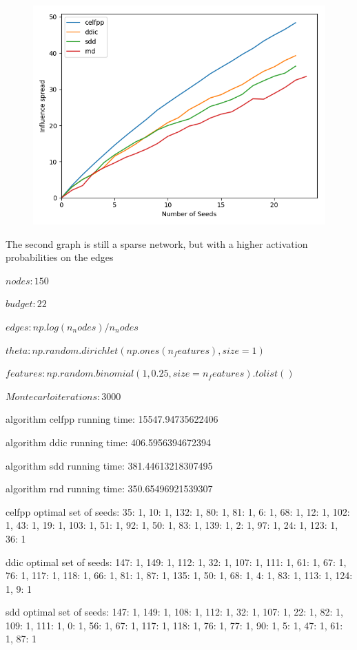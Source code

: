 \begin{figure}[H]
	\centering
	\includegraphics[scale=0.6]{img/IMG1}
\end{figure}


The second graph is still a sparse network, but with a higher activation probabilities on the edges

$nodes: 150$

$budget: 22$

$edges: np.log(n_nodes) / n_nodes$

$theta: np.random.dirichlet(np.ones(n_features), size=1)$

$features: np.random.binomial(1, 0.25, size=n_features).tolist()$

$Montecarlo iterations: 3000$

algorithm celfpp running time: 15547.94735622406

algorithm ddic running time: 406.5956394672394

algorithm sdd running time: 381.44613218307495

algorithm rnd running time: 350.65496921539307

celfpp optimal set of seeds: {35: 1, 10: 1, 132: 1, 80: 1, 81: 1, 6: 1, 68: 1, 12: 1, 102: 1, 43: 1, 19: 1, 103: 1, 51: 1, 92: 1, 50: 1, 83: 1, 139: 1, 2: 1, 97: 1, 24: 1, 123: 1, 36: 1}

ddic optimal set of seeds: {147: 1, 149: 1, 112: 1, 32: 1, 107: 1, 111: 1, 61: 1, 67: 1, 76: 1, 117: 1, 118: 1, 66: 1, 81: 1, 87: 1, 135: 1, 50: 1, 68: 1, 4: 1, 83: 1, 113: 1, 124: 1, 9: 1}

sdd optimal set of seeds: {147: 1, 149: 1, 108: 1, 112: 1, 32: 1, 107: 1, 22: 1, 82: 1, 109: 1, 111: 1, 0: 1, 56: 1, 67: 1, 117: 1, 118: 1, 76: 1, 77: 1, 90: 1, 5: 1, 47: 1, 61: 1, 87: 1}

